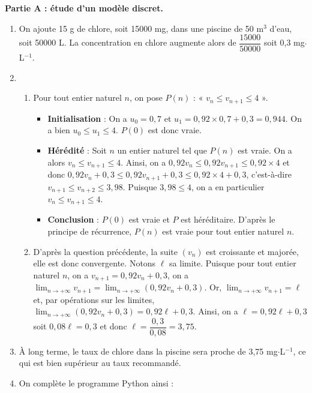 \documentclass[11pt,fleqn, openany]{book} %
\begin{document}
\begin{solution}

\textbf{Partie A : étude d'un modèle discret.}

\begin{enumerate}
\item On ajoute 15 g de chlore, soit 15000 mg, dans une piscine de 50 m$^3$ d'eau, soit 50000 L. La concentration en chlore augmente alors de $\dfrac{15000}{50000}$ soit 0,3 mg$\cdot$L$^{-1}$.
\item \begin{enumerate}
\item Pour tout entier naturel $n$, on pose $P(n)$ : « $v_n \leqslant v_{n+1} \leqslant 4$ ».
\begin{itemize}
\item \textbf{Initialisation}  : On a $u_0=0,7$ et $u_1=0,92 \times 0,7 + 0,3 = 0,944$. On a bien $u_0 \leqslant u_1 \leqslant 4$. $P(0)$ est donc vraie.
\item \textbf{Hérédité} : Soit $n$ un entier naturel tel que $P(n)$ est vraie. On a alors $v_n \leqslant v_{n+1} \leqslant 4$. Ainsi, on a $0,92v_n \leqslant 0,92v_{n+1} \leqslant 0,92 \times 4$ et donc $0,92v_n +0,3 \leqslant 0,92v_{n+1}+0,3 \leqslant 0,92 \times 4 +0,3$, c'est-à-dire $v_{n+1} \leqslant v_{n+2} \leqslant 3,98$. Puisque $3,98 \leqslant 4$, on a en particulier $v_n \leqslant v_{n+1} \leqslant 4$.
\item \textbf{Conclusion} : $P(0)$ est vraie et $P$ est héréditaire. D'après le principe de récurrence, $P(n)$ est vraie pour tout entier naturel $n$. 
\end{itemize}
\item D'après la question précédente, la suite $(v_n)$ est croissante et majorée, elle est donc convergente. Notons $\ell$ sa limite. Puisque pour tout entier naturel $n$, on a $v_{n+1}=0,92v_n+0,3$, on a $\displaystyle\lim_{n \to +\infty}v_{n+1}=\displaystyle\lim_{n \to +\infty}(0,92v_n+0,3)$. Or, $\displaystyle\lim_{n \to +\infty}v_{n+1}=\ell$ et, par opérations sur les limites, $\displaystyle\lim_{n \to +\infty}(0,92v_n+0,3)=0,92\ell +0,3$. Ainsi, on a $\ell = 0,92 \ell + 0,3$ soit $0,08\ell=0,3$ et donc $\ell = \dfrac{0,3}{0,08}=3,75$.
\end{enumerate}
\item À long terme, le taux de chlore dans la piscine sera proche de 3,75 mg$\cdot$L$^{-1}$, ce qui est bien supérieur au taux recommandé.
\item On complète le programme Python ainsi :


\end{enumerate}
\end{solution}
\end{document}
